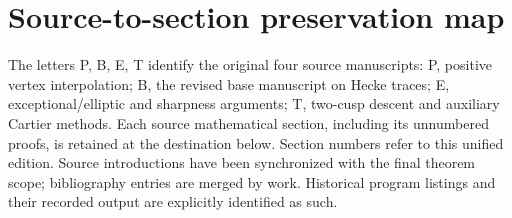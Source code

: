 \documentclass[11pt,a4paper]{article}
\theoremstyle{definition}\newtheorem{definition}[theorem]{Definition}
\theoremstyle{remark}\newtheorem{remark}[theorem]{Remark}
\numberwithin{equation}{section}
\begin{document}
\clearpage
\section{Source-to-section preservation map}\label{app:coverage}
The letters P, B, E, T identify the original four source manuscripts: P, positive vertex interpolation; B, the revised base manuscript on Hecke traces; E, exceptional/elliptic and sharpness arguments; T, two-cusp descent and auxiliary Cartier methods. Each source mathematical section, including its unnumbered proofs, is retained at the destination below. Section numbers refer to this unified edition. Source introductions have been synchronized with the final theorem scope; bibliography entries are merged by work. Historical program listings and their recorded output are explicitly identified as such.
\end{document}
